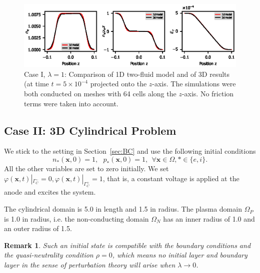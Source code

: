 \documentclass{article}
\newtheorem*{remark}{Remark}
\begin{document}
\begin{figure}
    \centering
    \includegraphics[scale=1.2]{z_axis_reduction.eps}
    \caption{Case I, $\lambda = 1$: Comparison of 1D two-fluid model and of 3D results (at
      time $t = 5 \times 10^{-4}$ projected onto the $z$-axis. The simulations were both
      conducted on meshes with 64 cells along the $z$-axis. No friction terms were taken
      into account.}
    \label{fig:z_axis_reduction}
\end{figure}

\subsection{Case II: 3D Cylindrical Problem}

We stick to the setting in Section~\ref{sec:BC} and use the following initial conditions
\begin{equation*}
    n_\ast(\mathbf{x}, 0) = 1, \ \ \  p_\ast(\mathbf{x},0) = 1, \ \ \forall \mathbf{x}\in\Omega, \ast \in \{e, i\}.
\end{equation*}
All the other variables are set to zero initially. We set $\varphi(\mathbf{x}, t)|_{\Gamma_C^-} = 0, \varphi(\mathbf{x}, t)|_{\Gamma_C^+} = 1$, that is, a constant voltage is applied at the anode and excites the system. 

The cylindrical domain is 5.0 in length and 1.5 in radius. The plasma domain $\Omega_P$ is
1.0 in radius, i.e. the non-conducting domain $\Omega_N$ has an inner radius of 1.0 and an
outer radius of 1.5.

\begin{remark}
  Such an initial state is compatible with the boundary conditions and the quasi-neutrality
  condition $\rho = 0$, which means no initial layer and boundary layer in the sense of
  perturbation theory will arise when $\lambda \rightarrow 0$.
\end{remark}
\end{document}
